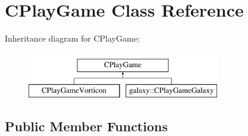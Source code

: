 \hypertarget{class_c_play_game}{
\section{CPlayGame Class Reference}
\label{class_c_play_game}
}
Inheritance diagram for CPlayGame:\begin{figure}[H]
\begin{center}
\leavevmode
\includegraphics[height=2cm]{class_c_play_game}
\end{center}
\end{figure}
\subsection*{Public Member Functions}
